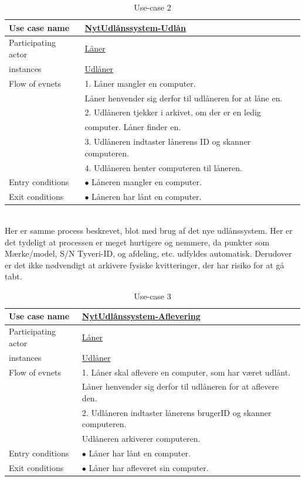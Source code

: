 \documentclass[a4paper]{article}
\begin{document}
\begin{table}[h]
\caption{Use-case 2}
\begin{tabular}{ll}
Use case name             & \underline{NytUdlånssystem-Udlån} \\ \hline
Participating actor           & \underline{Låner} \\
instances                     & \underline{Udlåner}\\ \hline
Flow of evnets                & 1. Låner mangler en computer.	\\& Låner henvender sig derfor til udlåneren for at låne en.
\\& 2. Udlåneren tjekker i arkivet, om der er en ledig \\& computer. Låner finder en.
\\& 3. Udlåneren indtaster lånerens ID og skanner computeren.
\\& 4. Udlåneren henter computeren til låneren.\\ \hline
Entry conditions & $\bullet$ Låneren mangler en computer. \\ \hline
Exit conditions  & $\bullet$ Låneren har lånt en computer. 
\end{tabular}
\end{table}\\
Her er samme process beskrevet, blot med brug af det nye udlånssystem. Her er det tydeligt at processen er meget hurtigere og nemmere, da punkter som Mærke/model, S/N Tyveri-ID, og afdeling, etc. udfyldes automatisk. Derudover er det ikke nødvendigt at arkivere fysiske kvitteringer, der har risiko for at gå tabt.
\newpage
\begin{table}[h]
\caption{Use-case 3}
\begin{tabular}{ll}
Use case name               & \underline{NytUdlånssystem-Aflevering} \\ \hline
Participating actor           & \underline{Låner} \\
instances                     & \underline{Udlåner}\\ \hline
Flow of evnets                & 1. Låner skal aflevere en computer, som har været udlånt.
\\& Låner henvender sig derfor til udlåneren for at aflevere den.
\\& 2. Udlåneren indtaster lånerens brugerID og skanner computeren.
\\& Udlåneren arkiverer computeren. \\ \hline
Entry conditions & $\bullet$ Låner har lånt en computer.\\ \hline
Exit conditions  & $\bullet$ Låner har afleveret sin computer.
\end{tabular}
\end{table}
\end{document}
